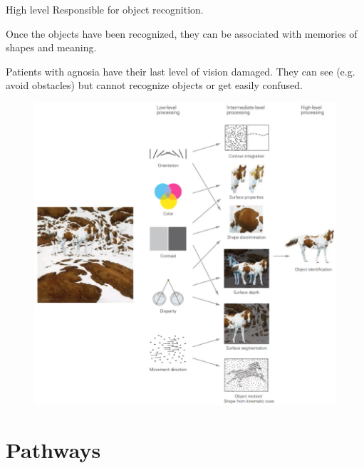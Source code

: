 \begin{description}
\begin{descriptionlist}
            \item[High level] 
                Responsible for object recognition.
                
                Once the objects have been recognized, they can be associated with memories of shapes and meaning.

                \begin{casestudy}[Agnosia]
                    Patients with agnosia have their last level of vision damaged.
                    They can see (e.g. avoid obstacles) but cannot recognize objects or get easily confused.
                \end{casestudy}
        \end{descriptionlist}

        \begin{figure}[H]
            \centering
            \includegraphics[width=0.55\linewidth]{./img/vision_levels.png}
        \end{figure}
\end{description}



\section{Pathways}

